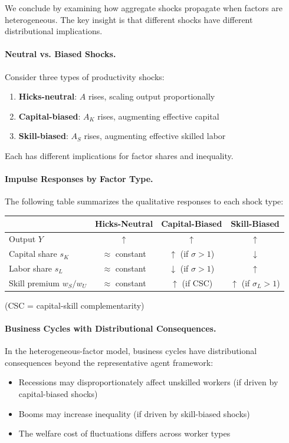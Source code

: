 We conclude by examining how aggregate shocks propagate when factors are heterogeneous. The key insight is that different shocks have different distributional implications.

\paragraph{Neutral vs. Biased Shocks.}
Consider three types of productivity shocks:
\begin{enumerate}[nosep]
\item \textbf{Hicks-neutral}: $A$ rises, scaling output proportionally
\item \textbf{Capital-biased}: $A_K$ rises, augmenting effective capital
\item \textbf{Skill-biased}: $A_S$ rises, augmenting effective skilled labor
\end{enumerate}

Each has different implications for factor shares and inequality.

\paragraph{Impulse Responses by Factor Type.}
The following table summarizes the qualitative responses to each shock type:

\begin{center}
\renewcommand{\arraystretch}{1.3}
\begin{tabular}{@{}lccc@{}}
\toprule
& \textbf{Hicks-Neutral} & \textbf{Capital-Biased} & \textbf{Skill-Biased} \\
\midrule
Output $Y$ & $\uparrow$ & $\uparrow$ & $\uparrow$ \\
Capital share $s_K$ & $\approx$ constant & $\uparrow$ (if $\sigma > 1$) & $\downarrow$ \\
Labor share $s_L$ & $\approx$ constant & $\downarrow$ (if $\sigma > 1$) & $\uparrow$ \\
Skill premium $w_S/w_U$ & $\approx$ constant & $\uparrow$ (if CSC) & $\uparrow$ (if $\sigma_L > 1$) \\
\bottomrule
\end{tabular}
\end{center}

(CSC = capital-skill complementarity)

\paragraph{Business Cycles with Distributional Consequences.}
In the heterogeneous-factor model, business cycles have distributional consequences beyond the representative agent framework:
\begin{itemize}[nosep]
\item Recessions may disproportionately affect unskilled workers (if driven by capital-biased shocks)
\item Booms may increase inequality (if driven by skill-biased shocks)
\item The welfare cost of fluctuations differs across worker types
\end{itemize}

